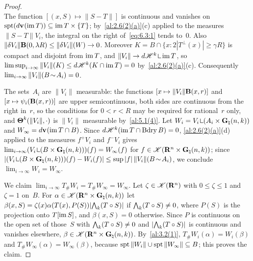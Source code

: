 \begin{proof}
\begin{equation}
    \end{equation}
    The function $[(x,S) \mapsto \|S - T\|]$ is continuous and vanishes on $\operatorname{spt} (d \mathbf{v}_{}(\operatorname{im}
    T)) \subseteq \operatorname{im} T \times \{ T \}$; by~\ref{al:2.6(2)(a)}(c) applied to the measures $\|S -
    T\| V_i$, the integral on the right of~\eqref{eq:6.3:1} tends to~$0$. Also $\|\delta V_i\|
    \mathbf{B}(0,\lambda R) \le \|\delta V_i\|(W) \to 0$. Moreover $K = B \cap \{ x : 2 |T^\perp(x)|
    \ge \gamma R \}$ is compact and disjoint from $\operatorname{im} T$, and $\|V_i\| \to d \HM^{\vdim} \restrict
    \im T$, so $\limsup_{i \to \infty} \|V_i\|(K) \le d \mathscr{H}^{k}(K \cap \operatorname{im} T) = 0$
    by~\ref{al:2.6(2)(a)}(c). Consequently $\lim_{i \to \infty} \|V_i\|(B \!\sim\! A_i) = 0$.

    The sets~$A_i$ are $\|V_i\|$ measurable: the functions $[x \mapsto \|V_i\| \mathbf{B}(x,r)]$
    and $[x \mapsto \psi_i(\mathbf{B}(x,r))]$ are upper semicontinuous, both sides are continuous
    from the right in~$r$, so the conditions for $0 < r < R$ may be required for rational~$r$
    only, and $\boldsymbol{\Theta}^{k}(\|V_i\|,\cdot)$ is $\|V_i\|$ measurable by~\ref{al:5.1(4)}. Let
    $W_i = V_i \restrict (A_i \times \pgrass{\adim}{\vdim})$ and $W_\infty = d \mathbf{v}_{}(\operatorname{im} T \cap
    B)$. Since $d \mathscr{H}^{k}(\operatorname{im} T \cap \operatorname{Bdry} B) = 0$, \ref{al:2.6(2)(a)}(d) applied to the
    measures $f^+ V_i$ and $f^- V_i$ gives $\lim_{i \to \infty} (V_i \restrict (B \times
    \pgrass{\adim}{\vdim}))(f) = W_\infty(f)$ for $f \in \mathscr{K}(\mathbf{R}^{n} \times
    \mathbf{G}_{\natural}(n,k))$; since $|(V_i \restrict (B \times \pgrass{\adim}{\vdim}))(f) -
    W_i(f)| \le \sup |f| \, \|V_i\|(B \without A_i)$, we conclude $\lim_{i \to \infty} W_i =
    W_\infty$.

    We claim $\lim_{i \to \infty} T_\# W_i = T_\# W_\infty = W_\infty$. Let $\zeta \in
    \mathscr{K}(\mathbf{R}^{n})$ with $0 \le \zeta \le 1$ and $\zeta = 1$ on~$B$. For $\alpha \in
    \mathscr{K}(\mathbf{R}^{n} \times \mathbf{G}_{\natural}(n,k))$ let $\beta(x,S) = \zeta(x) \alpha(T(x),
    P(S)) |{\textstyle\boldsymbol{\bigwedge}}_{{k}}(T \circ S)|$ if ${\textstyle\boldsymbol{\bigwedge}}_{{k}}(T \circ S) \ne 0$, where $P(S)$ is
    the projection onto $T[\operatorname{im} S]$, and $\beta(x,S) = 0$ otherwise. Since $P$ is continuous on the
    open set of those~$S$ with ${\textstyle\boldsymbol{\bigwedge}}_{{k}}(T \circ S) \ne 0$ and $|{\textstyle\boldsymbol{\bigwedge}}_{{k}}(T
    \circ S)|$ is continuous and vanishes elsewhere, $\beta \in \mathscr{K}(\mathbf{R}^{n} \times
    \mathbf{G}_{\natural}(n,k))$. By~\ref{al:3.2(1)}, $T_\# W_i(\alpha) = W_i(\beta)$ and $T_\#
    W_\infty(\alpha) = W_\infty(\beta)$, because $\operatorname{spt} \|W_i\| \cup \operatorname{spt} \|W_\infty\| \subseteq
    B$; this proves the claim.


\end{proof}
